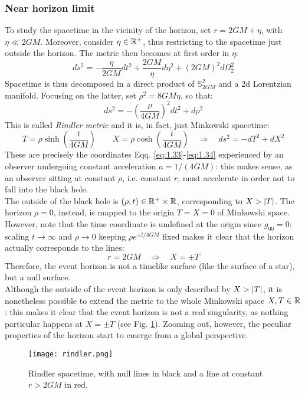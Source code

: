 \subsubsection{Near horizon limit}

To study the spacetime in the vicinity of the horizon, set $ r = 2GM + \eta $, with $ \eta \ll 2GM $. Moreover, consider $ \eta \in \mathbb{R}^+ $, thus restricting to the spacetime just outside the horizon. The metric then becomes at first order in $ \eta $:
\begin{equation*}
  ds^2 = - \frac{\eta}{2GM} dt^2 + \frac{2GM}{\eta} d\eta^2 + (2GM)^2 d\Omega_2^2
\end{equation*}
Spacetime is thus decomposed in a direct product of $ \mathbb{S}^2_{2GM} $ and a 2d Lorentzian manifold. Focusing on the latter, set $ \rho^2 = 8GM \eta $, so that:
\begin{equation*}
  ds^2 = - \left( \frac{\rho}{4GM} \right)^2 dt^2 + d\rho^2
\end{equation*}
This is called \textit{Rindler metric} and it is, in fact, just Minkowski spacetime:
\begin{equation*}
  T = \rho \sinh \left( \frac{t}{4GM} \right)
  \qquad
  X = \rho \cosh \left( \frac{t}{4GM} \right)
  \quad \Rightarrow \quad
  ds^2 = - dT^2 + dX^2
\end{equation*}
These are precisely the coordinates Eqq. \ref{eq:1.33}-\ref{eq:1.34} experienced by an observer undergoing constant acceleration $ a = 1 / (4GM) $: this makes sense, as an observer sitting at constant $ \rho $, i.e. constant $ r $, must accelerate in order not to fall into the black hole.\\
The outside of the black hole is $ (\rho,t) \in \mathbb{R}^+ \times \mathbb{R} $, corresponding to $ X > \left\lvert T\right\rvert $. The horizon $ \rho = 0 $, instead, is mapped to the origin $ T = X = 0 $ of Minkowski space. However, note that the time coordinate is undefined at the origin since $ g_{00} = 0 $: scaling $ t \rightarrow \infty $ and $ \rho \rightarrow 0 $ keeping $ \rho e^{\pm t / 4GM} $ fixed makes it clear that the horizon actually corresponds to the lines:
\begin{equation*}
  r = 2GM \quad \Rightarrow \quad X = \pm T
\end{equation*}
Therefore, the event horizon is not a timelike surface (like the surface of a star), but a null surface.\\
Although the outside of the event horizon is only described by $ X > \left\lvert T\right\rvert $, it is nonetheless possible to extend the metric to the whole Minkowski space $ X,T \in \mathbb{R} $: this makes it clear that the event horizon is not a real singularity, as nothing particular happens at $ X = \pm T $ (see Fig. \ref{rindler}). Zooming out, however, the peculiar properties of the horizon start to emerge from a global perspective.

\begin{figure}[b]
  \centering
  \texttt{[image: rindler.png]}
  \caption{Rindler spacetime, with null lines in black and a line at constant $ r > 2GM $ in red.}
  \label{rindler}
\end{figure}










